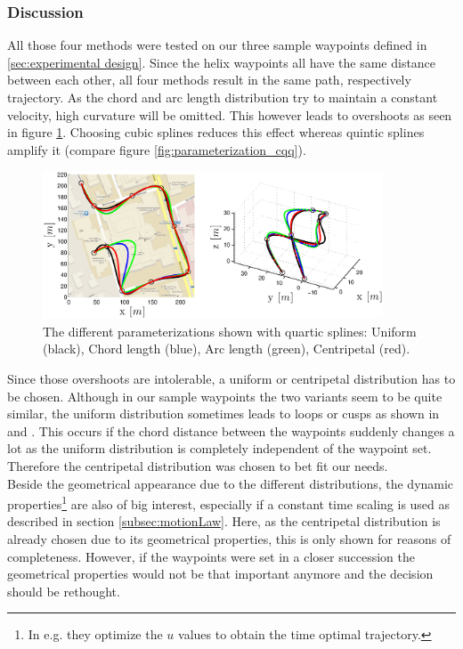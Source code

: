 \subsubsection{Discussion}


All those four methods were tested on our three sample waypoints defined in \ref{sec:experimental design}. Since the helix waypoints all have the same distance between each other, all four methods result in the same path, respectively trajectory. As the chord and arc length distribution try to maintain a constant velocity, high curvature will be omitted. This however leads to overshoots as seen in figure \ref{fig:parameterizations4_road_agile}. Choosing cubic splines reduces this effect whereas quintic splines amplify it (compare figure \ref{fig:parameterization_cqq}).

\begin{figure}[H]
	\centering
    \includegraphics[width = 0.9\textwidth]{graphics/Parameterizations4_road_agile.eps}
  \caption{The different parameterizations shown with quartic splines: Uniform (black), Chord length (blue), Arc length (green), Centripetal (red).}
  \label{fig:parameterizations4_road_agile}
\end{figure}

Since those overshoots are intolerable, a uniform or centripetal distribution has to be chosen. Although in our sample waypoints the two variants seem to be quite similar, the uniform distribution sometimes leads to  loops or cusps as shown in \cite{lee} and \cite{haron}. This occurs if the chord distance between the waypoints suddenly changes a lot as the uniform distribution is completely independent of the waypoint set. Therefore the centripetal distribution was chosen to bet fit our needs.
\\
Beside the geometrical appearance due to the different distributions, the dynamic properties\footnote{In \cite{mellinger} e.g. they optimize the $u$ values to obtain the time optimal trajectory.} are also of big interest, especially if a constant time scaling is used as described in section \ref{subsec:motionLaw}. Here, as the centripetal distribution is already chosen due to its geometrical properties, this is only shown for reasons of completeness. However, if the waypoints were set in a closer succession the geometrical properties would not be that important anymore and the decision should be rethought.

